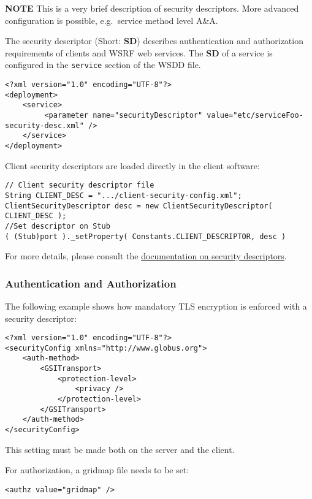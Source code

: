 \documentclass{article}
\begin{document}
\textbf{NOTE} This is a very brief description of security
descriptors. More advanced configuration is possible, e.g.~service
method level A\&A.

The security descriptor (Short: \textbf{SD}) describes
authentication and authorization requirements of clients and WSRF
web services. The \textbf{SD} of a service is configured in the
\verb!service! section of the WSDD file.

\begin{verbatim}
<?xml version="1.0" encoding="UTF-8"?>
<deployment>
    <service>
         <parameter name="securityDescriptor" value="etc/serviceFoo-security-desc.xml" /> 
    </service>
</deployment>
\end{verbatim}

Client security descriptors are loaded directly in the client
software:

\begin{verbatim}
// Client security descriptor file 
String CLIENT_DESC = ".../client-security-config.xml";
ClientSecurityDescriptor desc = new ClientSecurityDescriptor( CLIENT_DESC );
//Set descriptor on Stub 
( (Stub)port )._setProperty( Constants.CLIENT_DESCRIPTOR, desc )
\end{verbatim}

For more details, please consult the
\href{http://www.globus.org/toolkit/docs/development/4.1.2/security/security-secdesc.html}{documentation on security descriptors}.

\subsubsection{Authentication and Authorization}

The following example shows how mandatory TLS encryption is
enforced with a security descriptor:


\begin{verbatim}
<?xml version="1.0" encoding="UTF-8"?>
<securityConfig xmlns="http://www.globus.org">
    <auth-method>
        <GSITransport>
            <protection-level>
                <privacy />
            </protection-level>
        </GSITransport>
    </auth-method>
</securityConfig>
\end{verbatim}

This setting must be made both on the server and the client.

For authorization, a gridmap file needs to be set:


\begin{verbatim}
<authz value="gridmap" />
\end{verbatim}
\end{document}

